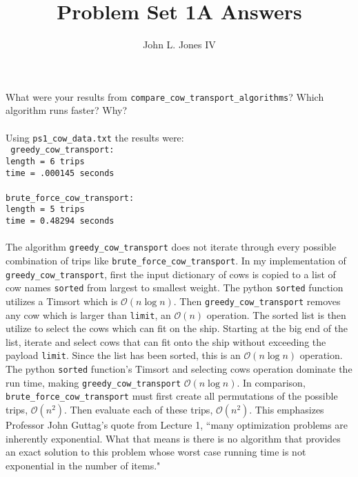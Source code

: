 \documentclass[letterpaper,11pt]{article}
\begin{document}
\title{Problem Set 1A Answers}
\author{John L. Jones IV}
\maketitle
\pagebreak

\section{}
What were your results from \texttt{compare\_cow\_transport\_algorithms}? Which algorithm runs faster? Why? \\
\\
Using \texttt{ps1\_cow\_data.txt} the results were: \\
\texttt{
  greedy\_cow\_transport:\\
  length =  6 trips \\
  time = .000145 seconds \\
  \\
  brute\_force\_cow\_transport: \\
  length =  5 trips \\
  time = 0.48294 seconds \\
}
\\
The algorithm \texttt{greedy\_cow\_transport} does not iterate through every possible combination of trips
like \texttt{brute\_force\_cow\_transport}.
In my implementation of \texttt{greedy\_cow\_transport}, first the input dictionary of cows is copied to a 
list of cow names \texttt{sorted} from largest to smallest weight. 
The python \texttt{sorted} function utilizes a Timsort which is $\mathcal{O}(n\log{}n)$.
Then \texttt{greedy\_cow\_transport} removes any cow which is larger than \texttt{limit},
an $\mathcal{O}(n)$ operation. 
The sorted list is then utilize to select the cows which can fit on the ship.
Starting at the big end of the list,
iterate and select cows that can fit onto the ship without exceeding the payload \texttt{limit}.
Since the list has been sorted, this is an $\mathcal{O}(n\log{}n)$ operation.
The python \texttt{sorted} function's Timsort and 
selecting cows operation dominate the run time,
making \texttt{greedy\_cow\_transport} $\mathcal{O}(n\log{}n)$.
In comparison, \texttt{brute\_force\_cow\_transport} must first create all permutations of the possible trips, 
$\mathcal{O}(n^{2})$.
Then evaluate each of these trips, $\mathcal{O}(n^{2})$.
This emphasizes Professor John Guttag's quote from Lecture 1, ``many optimization problems are inherently exponential.
What that means is there is no algorithm that provides an exact solution to this problem whose worst case running time
is not exponential in the number of items."
\end{document}
